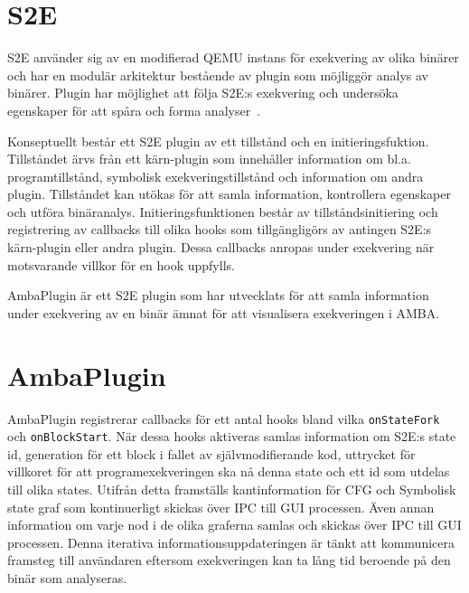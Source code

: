 
\section{S2E}
S2E använder sig av en modifierad QEMU instans för exekvering av olika binärer och har en modulär arkitektur bestående av plugin som möjliggör analys av binärer. Plugin har möjlighet att följa S2E:s exekvering och undersöka egenskaper för att spåra och forma analyser~\cite{Chipounov12}.

Konseptuellt består ett S2E plugin av ett tillstånd och en initieringsfuktion. Tillståndet ärvs från ett kärn-plugin som innehåller information om bl.a. programtillstånd, symbolisk exekveringstillstånd och information om andra plugin. Tillståndet kan utökas för att samla information, kontrollera egenskaper och utföra binäranalys. Initieringsfunktionen består av tillståndsinitiering och registrering av callbacks till olika hooks som tillgängligörs av antingen S2E:s kärn-plugin eller andra plugin. Dessa callbacks anropas under exekvering när motsvarande villkor för en hook uppfylls.

AmbaPlugin är ett S2E plugin som har utvecklats för att samla information under exekvering av en binär ämnat för att visualisera exekveringen i AMBA.

\section{AmbaPlugin}
AmbaPlugin registrerar callbacks för ett antal hooks bland vilka \texttt{onStateFork} och \texttt{onBlockStart}.
När dessa hooks aktiveras samlas information om S2E:s state id, generation för ett block i fallet av självmodifierande kod, uttrycket för villkoret för att programexekveringen ska nå denna state och ett id som utdelas till olika states. Utifrån detta framställs kantinformation för CFG och Symbolisk state graf som kontinuerligt skickas över IPC till GUI processen. Även annan information om varje nod i de olika graferna samlas och skickas över IPC till GUI processen. Denna iterativa informationsuppdateringen är tänkt att kommunicera framsteg till användaren eftersom exekveringen kan ta lång tid beroende på den binär som analyseras.

